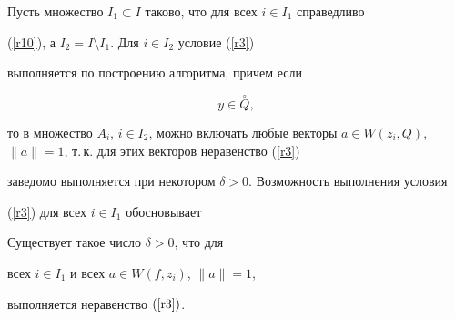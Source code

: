 Пусть множество $I_1\subset I$ таково, что для всех $i\in I_1$ справедливо


(\ref{r10}), а $I_2=I\setminus I_1$. Для $i\in I_2$ условие (\ref{r3})


выполняется по построению алгоритма, причем если




\begin{equation} \label{r11}


y\in \overset{\circ}{Q},


\end{equation}


%


то в множество $A_i$, $i\in I_2$, можно включать любые векторы $a\in


W(z_i,Q)$, $\|a\|=1$, т.\,к. для этих векторов неравенство (\ref{r3})


заведомо выполняется при некотором $\delta >0$. Возможность выполнения условия


(\ref{r3}) для всех $i\in I_1$ обосновывает 








\begin{lem}\label{l2}


Существует такое число $\delta>0$, что для


всех $i\in I_1$ и всех $a\in W(f,z_i)$, $\|a\|=1$,


выполняется неравенство $(\ref{r3})$.


\end{lem}





